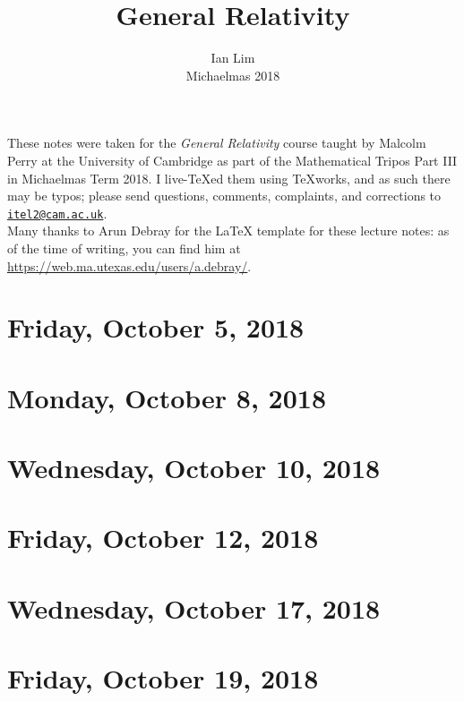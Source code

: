 \documentclass[reqno]{amsart}
\begin{document}
\title{General Relativity}
\author{Ian Lim\\ Michaelmas 2018}
\maketitle
{\small\noindent These notes were taken for the \textit{General Relativity} course taught by Malcolm Perry at the University of Cambridge as part of the Mathematical Tripos Part III in Michaelmas Term 2018. I live-\TeX ed them using TeXworks, and as such there may be typos; please send questions, comments, complaints, and corrections to 
\href{mailto:itel2@cam.ac.uk?subject=GR\%20Lecture\%20Notes}{\texttt{itel2@cam.ac.uk}}.\\
Many thanks to Arun Debray for the {\LaTeX} template for these lecture notes: as of the time of writing, you can find him at \url{https://web.ma.utexas.edu/users/a.debray/}.}

\tableofcontents

\section{Friday, October 5, 2018}
	

\section{Monday, October 8, 2018}
	

\section{Wednesday, October 10, 2018}
	

\section{Friday, October 12, 2018}
	

\section{Wednesday, October 17, 2018}
    

\section{Friday, October 19, 2018}
    
    
\end{document}
